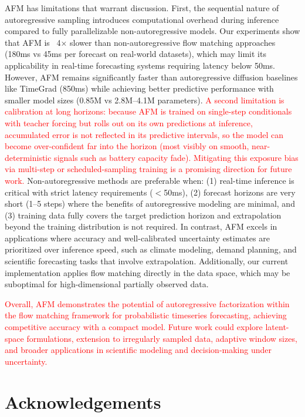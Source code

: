 \documentclass[a4paper,10pt,twocolumn,preprint,3p]{elsarticle}
\begin{document}
AFM has limitations that warrant discussion. First, the sequential nature of autoregressive sampling introduces computational overhead during inference compared to fully parallelizable non-autoregressive models. Our experiments show that AFM is ~4× slower than non-autoregressive flow matching approaches (180ms vs 45ms per forecast on real-world datasets), which may limit its applicability in real-time forecasting systems requiring latency below 50ms. However, AFM remains significantly faster than autoregressive diffusion baselines like TimeGrad (850ms) while achieving better predictive performance with smaller model sizes (0.85M vs 2.8M--4.1M parameters). \textcolor{red}{A second limitation is calibration at long horizons: because AFM is trained on single-step conditionals with teacher forcing but rolls out on its own predictions at inference, accumulated error is not reflected in its predictive intervals, so the model can become over-confident far into the horizon (most visibly on smooth, near-deterministic signals such as battery capacity fade). Mitigating this exposure bias via multi-step or scheduled-sampling training is a promising direction for future work.}
Non-autoregressive methods are preferable when: (1) real-time inference is critical with strict latency requirements ($<$50ms), (2) forecast horizons are very short (1--5 steps) where the benefits of autoregressive modeling are minimal, and (3) training data fully covers the target prediction horizon and extrapolation beyond the training distribution is not required. In contrast, AFM excels in applications where accuracy and well-calibrated uncertainty estimates are prioritized over inference speed, such as climate modeling, demand planning, and scientific forecasting tasks that involve extrapolation. 
Additionally, our current implementation applies flow matching directly in the data space, which may be suboptimal for high-dimensional partially observed data. 

\textcolor{red}{Overall, AFM demonstrates the potential of autoregressive factorization within the flow matching framework for probabilistic timeseries forecasting, achieving competitive accuracy with a compact model. Future work could explore latent-space formulations, extension to irregularly sampled data, adaptive window sizes, and broader applications in scientific modeling and decision-making under uncertainty.}

\section*{Acknowledgements}
\end{document}
